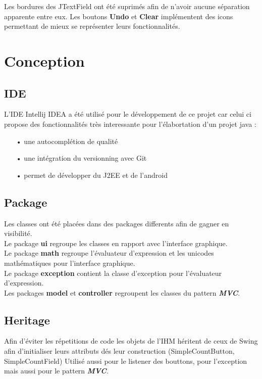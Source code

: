 \documentclass{article}
\begin{document}
	Les bordures des JTextField ont été suprimés afin de n'avoir aucune séparation apparente entre eux.
	Les boutons \textbf{Undo} et \textbf{Clear} implémentent des icons permettant de mieux se représenter leurs fonctionnalités.
\section{Conception}

	\subsection{IDE}
	L'IDE Intellij IDEA a été utilisé pour le développement de ce projet	car celui ci propose
	des fonctionnalités très interessante pour l'élabortation d'un projet java :
	\begin{itemize}
	\item[•] une autocomplétion de qualité
	\item[•] une intégration du versionning avec Git
	\item[•] permet de développer du J2EE et de l'android
	\end{itemize}		

	\subsection{Package}
	Les classes ont été placées dans des packages differents afin de gagner en visibilité.\\
	Le package \textbf{ui} regroupe les classes en rapport avec l'interface graphique.\\
	Le package \textbf{math} regroupe l'évaluateur d'expression et les
	unicodes mathématiques pour l'interface graphique.\\
	Le package \textbf{exception} contient la classe d'exception pour l'évaluateur d'expression.\\
	Les packages \textbf{model} et \textbf{controller} regroupent les classes du pattern \textit{\textbf{MVC}}.

	\subsection{Heritage}
	Afin d'éviter les répetitions de code les objets de l'IHM héritent de ceux de Swing afin
	d'initialiser leurs attributs dés leur construction (SimpleCountButton, SimpleCountField)
	Utilisé aussi pour le listener des bouttons, pour l'exception mais aussi pour le pattern \textit{\textbf{MVC}}.
\end{document}
